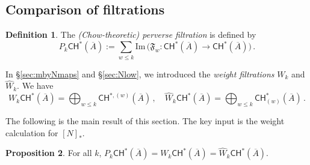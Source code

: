 \documentclass[11pt]{article}
\def\CH{\mathsf{CH}}
\def\im{\mathrm{Im}\,}
\def\fm{\mathfrak{F}}
\newcommand{\barA}{\overline{A}}
\theoremstyle{definition}
\newtheorem{definition}{Definition}[section]
\newtheorem{proposition}[definition]{Proposition}
\begin{document}
\subsection{Comparison of filtrations}
\begin{definition}
    The {\em (Chow-theoretic) perverse filtration} is defined by
    \[
    P_k \CH^*(\barA) := \sum_{w \le k} \im \Big(\fm_w : \CH^*(\barA) \to \CH^*(\barA) \Big)\,.
    \]
\end{definition}

In \S \ref{sec:mbyNmaps} and \S\ref{sec:Nlow}, we introduced the {\em weight filtrations} $W_k$ and $\widehat{W}_k$. We have
\[
W_k \CH^*(\barA) = \bigoplus_{w\leq k}\CH^{*,(w)}(\barA)\, ,\quad \widehat{W}_k \CH^{*}(\barA) = \bigoplus_{w\le k} \CH^*_{(w)}(\barA)\,.
\]

The following is the main result of this section. The key input is the weight calculation for $[N]_*$.
\begin{proposition}\label{pro:P=W}
    For all $k$, $P_k \CH^*(\barA) = W_k \CH^*(\barA) = \widehat{W}_k\CH^*(\barA)$.
\end{proposition}
\end{document}
